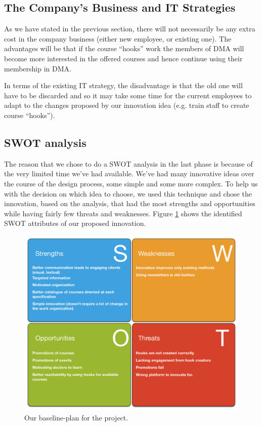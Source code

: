 \subsection{The Company’s Business and IT Strategies}
As we have stated in the previous section, there will not necessarily be any extra cost in the company business (either new employee, or existing one). The advantages will be that if the course “hooks” work the members of DMA will become more interested in the offered courses and hence continue using their membership in DMA.

In terms of the existing IT strategy, the disadvantage is that the old one will have to be discarded and so it may take some time for the current employees to adapt to the changes proposed by our innovation idea (e.g. train staff to create course “hooks”).


\subsection{SWOT analysis}
The reason that we chose to do a SWOT analysis in the last phase is because of the very limited time we’ve had available. We’ve had many innovative ideas over the course of the design process, some simple and some more complex. To help us with the decision on which idea to choose, we used this technique and chose the innovation, based on the analysis, that had the most strengths and opportunities while having fairly few threats and weaknesses. Figure \ref{fig:anal_swot} shows the identified SWOT attributes of our proposed innovation.

\begin{figure}[h!]
 \begin{center}
  \includegraphics[width=1\textwidth]{figures/swot.pdf}
  \caption{Our baseline-plan for the project.\label{fig:anal_swot}}
 \end{center}
\end{figure}

